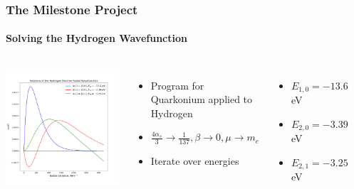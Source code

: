 \documentclass[mathserif, 10pt,usenames,dvipsnames]{beamer}
\begin{document}
\begin{frame}
    \frametitle{The Milestone Project}
    \framesubtitle{Solving the Hydrogen Wavefunction}
    \begin{columns}[c]
        \begin{center}
            \includegraphics[scale=0.2]{images/hydro.png}
        \end{center}
        \begin{itemize}
            \item Program for Quarkonium applied to Hydrogen
            \item $\frac{4\alpha_s}{3} \to \frac{1}{137}, \beta \to 0, \mu \to m_e$
            \item Iterate over energies
        \end{itemize}
        \begin{itemize}
            \item $E_{1,0} = -13.6\,$eV
            \item $E_{2,0} = -3.39\,$eV
            \item $E_{2,1} = -3.25\,$eV
        \end{itemize}
        \begin{center}

\end{center}
\end{columns}
\end{frame}
\end{document}

